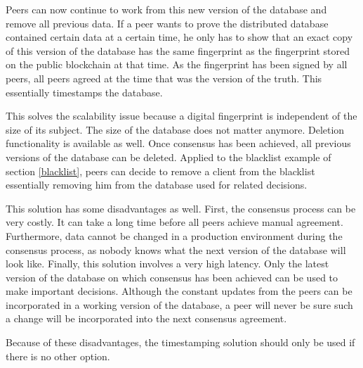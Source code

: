 Peers can now continue to work from this new version of the database and remove all previous data. If a peer wants to prove the distributed database contained certain data at a certain time, he only has to show that an exact copy of this version of the database has the same fingerprint as the fingerprint stored on the public blockchain at that time. As the fingerprint has been signed by all peers, all peers agreed at the time that was the version of the truth. This essentially timestamps the database.


This solves the scalability issue because a digital fingerprint is independent of the size of its subject. The size of the database does not matter anymore. Deletion functionality is available as well. Once consensus has been achieved, all previous versions of the database can be deleted. Applied to the blacklist example of section \ref{blacklist}, peers can decide to remove a client from the blacklist essentially removing him from the database used for related decisions.


\iffalse
disadvantages: 
- very costly consensus process: manual agreement on the data can take a long time, during the consensus process, the data cannot be changed in a production environment.
- very high latency: only the database on which there has been achieved consensus can be used to make important decisions. the constant changes from peers can be incorporated into small decisions, but a peer is never sure such a change will be incorporated in the next consensus agreement.
\fi

This solution has some disadvantages as well. First, the consensus process can be very costly. It can take a long time before all peers achieve manual agreement. Furthermore, data cannot be changed in a production environment during the consensus process, as nobody knows what the next version of the database will look like. Finally, this solution involves a very high latency. Only the latest version of the database on which consensus has been achieved can be used to make important decisions. Although the constant updates from the peers can be incorporated in a working version of the database, a peer will never be sure such a change will be incorporated into the next consensus agreement.

Because of these disadvantages, the timestamping solution should only be used if there is no other option.